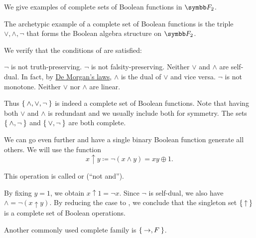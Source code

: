 \begin{example}\label{ex:posts_completeness_theorem}
  We give examples of complete sets of Boolean functions in \( \BF_2 \).

  \begin{ExEnum}
     The archetypic example of a complete set of Boolean functions is the triple \( \vee, \wedge, \neg \) that forms the Boolean algebra structure on \( \BF_2 \).

    We verify that the conditions of  are satisfied:
    \begin{RefList}
       \( \neg \) is not truth-preserving.
       \( \neg \) is not falsity-preserving.
       Neither \( \vee \) and \( \wedge \) are self-dual. In fact, by \hyperref[thm:de_morgans_laws]{De Morgan's laws}, \( \wedge \) is the dual of \( \vee \) and vice versa.
       \( \neg \) is not monotone.
       Neither \( \vee \) nor \( \wedge \) are linear.
    \end{RefList}

    Thus \( \Set{ \wedge, \vee, \neg } \) is indeed a complete set of Boolean functions. Note that having both \( \vee \) and \( \wedge \) is redundant and we usually include both for symmetry. The sets \( \Set{ \wedge, \neg } \) and \( \Set{ \vee, \neg } \) are both complete.

     We can go even further and have a single binary Boolean function generate all others. We will use the function
    \begin{equation}\label{eq:ex:posts_completeness_theorem/nand}
      x \uparrow y \coloneqq \neg(x \wedge y) = xy \oplus 1.
    \end{equation}

    This operation is called  or  (\enquote{not and}).

    By fixing \( y = 1 \), we obtain \( x \uparrow 1 = \neg x \). Since \( \neg \) is self-dual, we also have \( \wedge = \neg(x \uparrow y) \). By reducing the case to , we conclude that the singleton set \( \Set{ \uparrow } \) is a complete set of Boolean operations.

     Another commonly used complete family is \( \Set{ \rightarrow, F } \).


\end{ExEnum}
\end{example}
